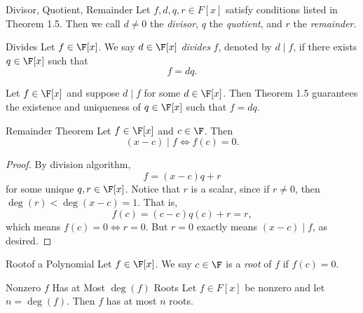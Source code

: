 \documentclass[linearalgebraII]{subfiles}
\begin{document}
    \begin{definition}{Divisor, Quotient, Remainder}{}
        Let $f, d, q, r\in F[x]$ satisfy conditions listed in Theorem 1.5. Then we call $d\neq 0$ the \emph{divisor}, $q$ the \emph{quotient}, and $r$ the \emph{remainder}.
    \end{definition}

    \begin{definition}{Divides}{}
        Let $f\in \F[x]$. We say $d\in \F[x]$ \emph{divides} $f$, denoted by $d\mid f$, if there exists $q\in\F[x]$ such that
        \begin{equation*}
            f = dq.
        \end{equation*}
    \end{definition}

    \begin{remark}
        Let $f\in\F[x]$ and suppose $d\mid f$ for some $d\in\F[x]$. Then Theorem 1.5 guarantees the existence and uniqueness of $q\in\F[x]$ such that $f = dq$.
    \end{remark}

    \begin{cor}{Remainder Theorem}
        Let $f\in \F[x]$ and $c\in \F$. Then
        \begin{equation*}
            (x-c)\mid f \iff f(c) = 0.
        \end{equation*}
    \end{cor}

    \begin{proof}
        By division algorithm,
        \begin{equation*}
            f = (x-c)q + r
        \end{equation*}
        for some unique $q,r\in \F[x]$. Notice that $r$ is a scalar, since if $r\neq 0$, then $\deg(r)< \deg(x-c) = 1$. That is,
        \begin{equation*}
            f(c) = (c-c)q(c)+r = r,
        \end{equation*}
        which means $f(c) = 0 \iff r = 0$. But $r=0$ exactly means $(x-c)\mid f$, as desired.
    \end{proof}

    \begin{definition}{Root}{of a Polynomial}
        Let $f\in \F[x]$. We say $c\in \F$ is a \emph{root} of $f$ if $f(c) = 0$.
    \end{definition}

    \clearpage
    \begin{cor}{Nonzero $f$ Has at Most $\deg(f)$ Roots}
        Let $f\in F[x]$ be nonzero and let $n=\deg(f)$. Then $f$ has at most $n$ roots.
    \end{cor}
\end{document}
